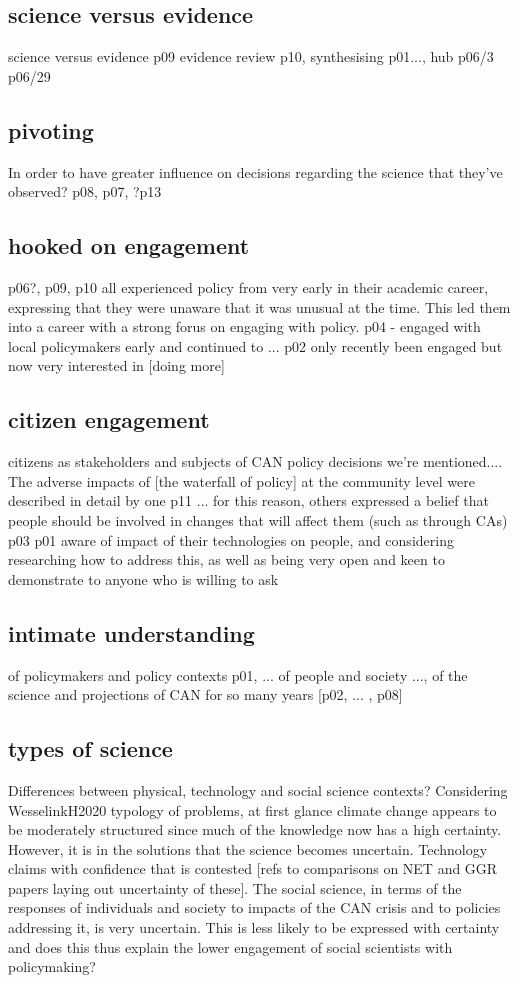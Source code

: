 \subsection{science versus evidence}
science versus evidence p09
evidence review p10, synthesising p01..., hub p06/3 p06/29




\subsection{pivoting}
In order to have greater influence on decisions regarding the science that they've observed?
p08, p07, ?p13

\subsection{hooked on engagement}
p06?, p09, p10 all experienced policy from very early in their academic career, expressing that they were unaware that it was unusual at the time. This led them into a career with a strong forus on engaging with policy. p04 - engaged with local policymakers early and continued to ... p02 only recently been engaged but now very interested in [doing more]

\subsection{citizen engagement}
citizens as stakeholders and subjects of CAN policy decisions we're mentioned.... The adverse impacts of [the waterfall of policy] at the community level were described in detail by one p11 ... for this reason, others expressed a belief that people should be involved in changes that will affect them (such as through CAs) p03  p01 aware of impact of their technologies on people, and considering researching how to address this, as well as being very open and keen to demonstrate to anyone who is willing to ask

\subsection{intimate understanding}
of policymakers and policy contexts p01, ...
of people and society ..., of the science and projections of CAN for so many years [p02, ... , p08]

\subsection{types of science}
Differences between physical, technology and social science contexts?
Considering WesselinkH2020 typology of problems, at first glance climate change appears to be moderately structured since much of the knowledge now has a high certainty. However, it is in the solutions that the science becomes uncertain. Technology claims with confidence that is contested [refs to comparisons on NET and GGR papers laying out uncertainty of these]. The social science, in terms of the responses of individuals and society to impacts of the CAN crisis and to policies addressing it, is very uncertain. This is less likely to be expressed with certainty and does this thus explain the lower engagement of social scientists with policymaking?

